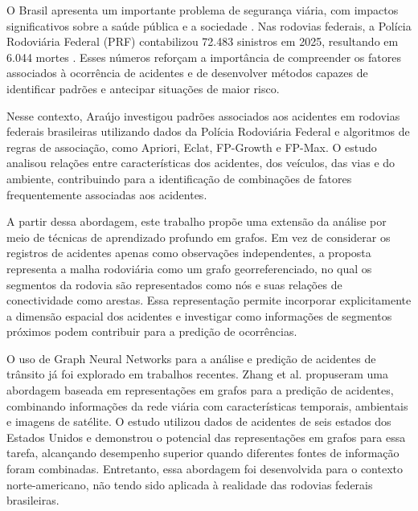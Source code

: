 \documentclass[12pt]{article}
\begin{document}
O Brasil apresenta um importante problema de segurança viária, com
impactos significativos sobre a saúde pública e a sociedade
\cite{who2023}. Nas rodovias federais, a Polícia Rodoviária Federal
(PRF) contabilizou 72.483 sinistros em 2025, resultando em 6.044 mortes
\cite{prf2026}. Esses números reforçam a importância de compreender os
fatores associados à ocorrência de acidentes e de desenvolver métodos
capazes de identificar padrões e antecipar situações de maior risco.

Nesse contexto, Araújo \cite{araujo2022} investigou padrões associados
aos acidentes em rodovias federais brasileiras utilizando dados da
Polícia Rodoviária Federal e algoritmos de regras de associação, como
Apriori, Eclat, FP-Growth e FP-Max. O estudo analisou relações entre
características dos acidentes, dos veículos, das vias e do ambiente,
contribuindo para a identificação de combinações de fatores
frequentemente associadas aos acidentes.

A partir dessa abordagem, este trabalho propõe uma extensão da análise
por meio de técnicas de aprendizado profundo em grafos. Em vez de
considerar os registros de acidentes apenas como observações
independentes, a proposta representa a malha rodoviária como um grafo
georreferenciado, no qual os segmentos da rodovia são representados
como nós e suas relações de conectividade como arestas. Essa
representação permite incorporar explicitamente a dimensão espacial
dos acidentes e investigar como informações de segmentos próximos
podem contribuir para a predição de ocorrências.

O uso de Graph Neural Networks para a análise e predição de acidentes
de trânsito já foi explorado em trabalhos recentes. Zhang et al.
\cite{zhang2026} propuseram uma abordagem baseada em representações
em grafos para a predição de acidentes, combinando informações da rede
viária com características temporais, ambientais e imagens de
satélite. O estudo utilizou dados de acidentes de seis estados dos
Estados Unidos e demonstrou o potencial das representações em grafos
para essa tarefa, alcançando desempenho superior quando diferentes
fontes de informação foram combinadas. Entretanto, essa abordagem foi
desenvolvida para o contexto norte-americano, não tendo sido aplicada
à realidade das rodovias federais brasileiras.
\end{document}
